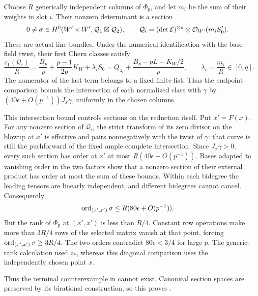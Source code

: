 Choose $R$ generically independent columns of $\Phi_p$, and let
$m_i$ be the sum of their weights in slot $i$. Their nonzero
determinant is a section
\[
 0\ne\sigma\in H^0(W'\times W',\mathcal Q_1\boxtimes\mathcal Q_2),
 \qquad
 \mathcal Q_i=(\det\mathcal E)^{\otimes s}
                 \otimes\mathcal O_{W'}(m_iS_0').
\]
These are actual line bundles. Under the numerical identification
with the base-field twist, their first Chern classes satisfy
\begin{equation}\label{eq:finite-determinant-classes}
 \frac{c_1(\mathcal Q_i)}R
 =\frac{B_p}p+\frac{p-1}{2p}K_W+\lambda_iS_0
 =Q_{\lambda_i}+\frac{B_p-pL-K_W/2}{p},
 \qquad \lambda_i=\frac{m_i}{R}\in[0,q].
\end{equation}
The numerator of the last term belongs to a fixed finite list.
Thus the endpoint comparison bounds the intersection of each
normalized class with $\gamma$ by
$(40\epsilon+O(p^{-1}))J_x\gamma$, uniformly in the chosen columns.

This intersection bound controls sections on the reduction itself.
Put $x'=F(x)$. For any nonzero section of $\mathcal Q_i$, the strict
transform of its zero divisor on the blowup at $x'$ is effective and
pairs nonnegatively with the
twist of $\gamma$: that curve is still the pushforward of the fixed
ample complete intersection. Since $J_x\gamma>0$, every such section
has order at $x'$ at most $R(40\epsilon+O(p^{-1}))$.
Bases adapted to vanishing order in the two factors show that a
nonzero section of their external product has order at most the sum
of these bounds. Within each bidegree the leading tensors are linearly
independent, and different bidegrees cannot cancel. Consequently
\[
 \operatorname{ord}_{(x',x')}\sigma\le R(80\epsilon+O(p^{-1})).
\]
But the rank of $\Phi_p$ at $(x',x')$ is less than $R/4$.
Constant row operations make more than $3R/4$ rows of the selected
matrix vanish at that point, forcing
$\operatorname{ord}_{(x',x')}\sigma\ge3R/4$. The two orders contradict
$80\epsilon<3/4$ for large $p$. The generic-rank calculation used
$z_*$, whereas this diagonal comparison uses the independently
chosen point $x$.

Thus the terminal counterexample in  cannot
exist. Canonical section spaces are preserved by its birational
construction, so this proves .
